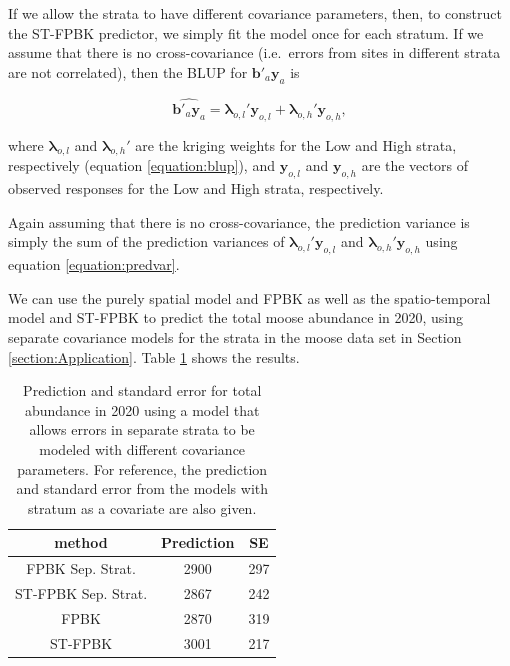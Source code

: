 \documentclass[]{article}    %
\begin{document}
If we allow the strata to have different covariance parameters, then, to
construct the ST-FPBK predictor, we simply fit the model once for each
stratum. If we assume that there is no cross-covariance (i.e.~errors
from sites in different strata are not correlated), then the BLUP for
\(\mathbf{b}'_a \mathbf{y}_a\) is

\begin{equation} \label{equation:blup_strat}
\widehat{\mathbf{b}'_a \mathbf{y}_a} = \bm{\lambda}_{o, l}' \mathbf{y}_{o, l} + \bm{\lambda}_{o, h}' \mathbf{y}_{o, h},
\end{equation}

where \(\bm{\lambda}_{o, l}\) and \(\bm{\lambda}_{o, h}'\) are the
kriging weights for the Low and High strata, respectively (equation
\ref{equation:blup}), and \(\mathbf{y}_{o, l}\) and
\(\mathbf{y}_{o, h}\) are the vectors of observed responses for the Low
and High strata, respectively.

Again assuming that there is no cross-covariance, the prediction
variance is simply the sum of the prediction variances of
\(\bm{\lambda}_{o, l}' \mathbf{y}_{o, l}\) and
\(\bm{\lambda}_{o, h}' \mathbf{y}_{o, h}\) using equation
\ref{equation:predvar}.

We can use the purely spatial model and FPBK as well as the
spatio-temporal model and ST-FPBK to predict the total moose abundance
in 2020, using separate covariance models for the strata in the moose
data set in Section \ref{section:Application}. Table
\ref{tab:sepstratres} shows the results.

\begin{table}[H]

\caption{\label{tab:sepstratres}Prediction and standard error for total abundance in 2020 using a model that allows errors in separate strata to be modeled with different covariance parameters. For reference, the prediction and standard error from the models with stratum as a covariate are also given.}
\centering
\begin{tabular}[t]{ccc}
\toprule
method & Prediction & SE\\
\midrule
FPBK Sep. Strat. & 2900 & 297\\
ST-FPBK Sep. Strat. & 2867 & 242\\
\midrule
FPBK & 2870 & 319\\
ST-FPBK & 3001 & 217\\
\bottomrule
\end{tabular}
\end{table}
\end{document}
